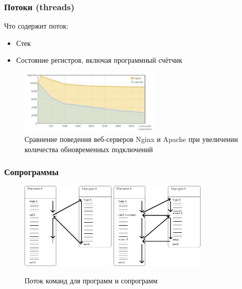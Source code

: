 \documentclass[aspectratio=169, pdf, 8pt, unicode]{beamer}
\begin{document}
\begin{frame}[fragile]
\frametitle{Потоки (threads)}
Что содержит поток:
	\begin{itemize}
		\item Стек
		\item Состояние регистров, включая программный счётчик
	\end{itemize}
\begin{figure}[H]
      \centering
      \includegraphics[width=0.6\textwidth]{fig/nginx-apache-10kreqs.png}
      \caption{Сравнение поведения веб-серверов Nginx и Apache при увеличении количества обновременных подключений}
\end{figure}
\end{frame}

\begin{frame}[fragile]
\frametitle{Сопрограммы}
\begin{figure}[H]
      \centering
		\includegraphics[width=0.4\textwidth]{fig/routine.png}
		\hspace{0.05\textwidth}
      \includegraphics[width=0.4\textwidth]{fig/coroutine.png}
      \caption{Поток команд для программ и сопрограмм}
\end{figure}
\end{frame}
\end{document}
